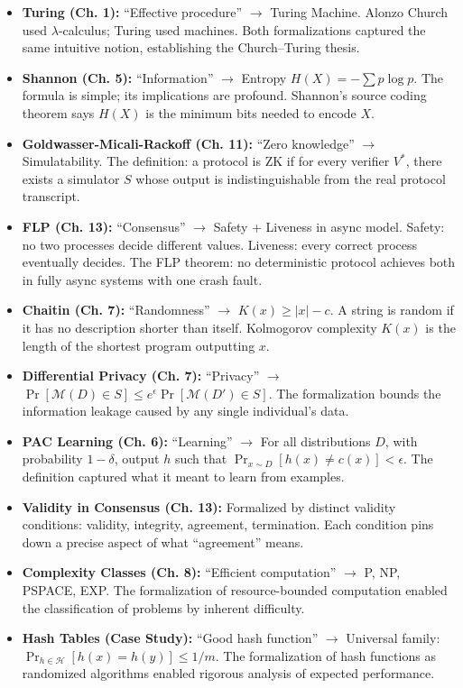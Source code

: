 \begin{itemize}
\item \textbf{Turing (Ch. 1):} ``Effective procedure'' $\to$ Turing Machine. Alonzo Church used $\lambda$-calculus; Turing used machines. Both formalizations captured the same intuitive notion, establishing the Church--Turing thesis.

\item \textbf{Shannon (Ch. 5):} ``Information'' $\to$ Entropy $H(X) = -\sum p \log p$. The formula is simple; its implications are profound. Shannon's source coding theorem says $H(X)$ is the minimum bits needed to encode $X$.

\item \textbf{Goldwasser-Micali-Rackoff (Ch. 11):} ``Zero knowledge'' $\to$ Simulatability. The definition: a protocol is ZK if for every verifier $V^*$, there exists a simulator $S$ whose output is indistinguishable from the real protocol transcript.

\item \textbf{FLP (Ch. 13):} ``Consensus'' $\to$ Safety + Liveness in async model. Safety: no two processes decide different values. Liveness: every correct process eventually decides. The FLP theorem: no deterministic protocol achieves both in fully async systems with one crash fault.

\item \textbf{Chaitin (Ch. 7):} ``Randomness'' $\to$ $K(x) \ge |x| - c$. A string is random if it has no description shorter than itself. Kolmogorov complexity $K(x)$ is the length of the shortest program outputting $x$.

\item \textbf{Differential Privacy (Ch. 7):} ``Privacy'' $\to$ $\Pr[\mathcal{M}(D) \in S] \le e^\epsilon \Pr[\mathcal{M}(D') \in S]$. The formalization bounds the information leakage caused by any single individual's data.

\item \textbf{PAC Learning (Ch. 6):} ``Learning'' $\to$ For all distributions $D$, with probability $1-\delta$, output $h$ such that $\Pr_{x \sim D}[h(x) \neq c(x)] < \epsilon$. The definition captured what it meant to learn from examples.

\item \textbf{Validity in Consensus (Ch. 13):} Formalized by distinct validity conditions: validity, integrity, agreement, termination. Each condition pins down a precise aspect of what ``agreement'' means.

\item \textbf{Complexity Classes (Ch. 8):} ``Efficient computation'' $\to$ P, NP, PSPACE, EXP. The formalization of resource-bounded computation enabled the classification of problems by inherent difficulty.

\item \textbf{Hash Tables (Case Study):} ``Good hash function'' $\to$ Universal family: $\Pr_{h \in \mathcal{H}}[h(x) = h(y)] \le 1/m$. The formalization of hash functions as randomized algorithms enabled rigorous analysis of expected performance.
\end{itemize}

